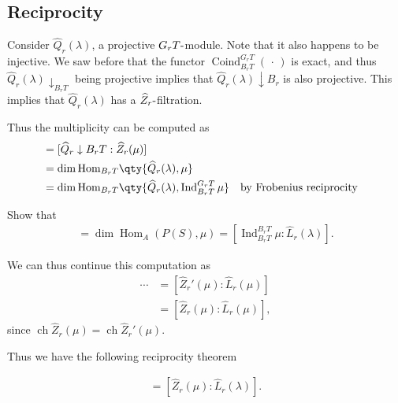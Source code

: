 \hypertarget{reciprocity}{%
\subsection{Reciprocity}\label{reciprocity}}

Consider \(\widehat{Q}_r(\lambda)\), a projective
\(G_r T{\hbox{-}}\)module. Note that it also happens to be injective. We
saw before that the functor
\(\operatorname{Coind}_{B_r T}^{G_r T}({\,\cdot\,})\) is exact, and thus
\(\widehat{Q}_r(\lambda)\downarrow_{B_r T}\) being projective implies
that \(\widehat{Q}_r(\lambda)\downarrow{B_r}\) is also projective. This
implies that \(\widehat{Q}_r(\lambda)\) has a
\(\widehat{Z}_r{\hbox{-}}\)filtration.

Thus the multiplicity can be computed as
\begin{align*}
[\widehat{Q}_r(\lambda) : \widehat{Z}_r(\mu)] 
&= [\widehat{Q}_r \downarrow{B_r T} : \widehat{Z}_r(\mu)] \\
&= \dim {\operatorname{Hom}}_{B_r T}\qty{\widehat{Q}_r(\lambda), \mu } \\
&= \dim {\operatorname{Hom}}_{B_r T}\qty{ \widehat{Q}_r(\lambda), \operatorname{Ind}_{B_r T}^{G_r T} \mu } && \text{by Frobenius reciprocity} \\
\end{align*}

\begin{exercise}[?]

Show that
\begin{align*}  
[M: S] = \dim {\operatorname{Hom}}_A( P(S), \mu) = [\operatorname{Ind}_{B_r T}^{B_r T} \mu : \widehat{L}_r(\lambda)]
.\end{align*}

\end{exercise}

We can thus continue this computation as
\begin{align*}  
\cdots 
&= [\widehat{Z}_r'(\mu) : \widehat{L}_r(\mu)] \\
&= [\widehat{Z}_r(\mu) : \widehat{L}_r(\mu)]
,\end{align*}
since
\(\operatorname{ch}\widehat{Z}_r (\mu) = \operatorname{ch}\widehat{Z}_r'(\mu)\).

Thus we have the following reciprocity theorem

\begin{theorem}[Humphreys]

\begin{align*}  
[\widehat{Q}_r(\lambda): \widehat{Z}_r(\mu)] = [\widehat{Z}_r(\mu) : \widehat{L}_r (\lambda) ]
.\end{align*}

\end{theorem}

